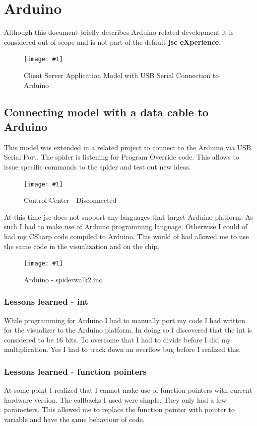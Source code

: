 \documentclass[12pt,leqno]{book}
\newcommand{\png}[1]{\texttt{[image: \#1]}}
\newcommand{\figpng}[2]{\begin{figure}[htb]\centering\png{#1}\caption{#2}\end{figure}}
\begin{document}
\chapter{Arduino}

Although this document briefly describes Arduino related development it is considered out of scope and is not part of the default \textbf{jsc eXperience}.

\figpng{Images/withusb}
{Client Server Application Model with USB Serial Connection to Arduino}

\section{Connecting model with a data cable to Arduino}
This model was extended in a related project to connect to the Arduino via USB Serial Port. 
The spider is listening for Program Override code. This allows to issue specific commands to the spider
and test out new ideas.

\figpng{Images/Hello_world_-_Google_Chrome-2012-03-15_08.11.17}
{Control Center - Disconnected}




At this time jsc does not support any languages that target Arduino platform. As such I had to make use of Arduino programming language. Otherwise I could of had my CSharp code compiled to Arduino. This would of had allowed me to use the same code in the visualization and on the chip.

\figpng{Images/spiderwalk2__Arduino_1.0-2012-03-14_18.04.43}
{Arduino - spiderwalk2.ino}


\subsection{Lessons learned - int}
While programming for Arduino I had to manually port my code I had written for the visualizer to the Arduino platform. In doing so I discovered that the int is considered to be 16 bits.  To overcome that I had to divide before I did my multiplication. Yes I had to track down an overflow bug before I realized this.

\subsection{Lessons learned - function pointers}
At some point I realized that I cannot make use of function pointers with current hardware version. The callbacks I used were simple. They only had a few parameters. This allowed me to replace the function pointer with pointer to variable and have the same behaviour of code.
\end{document}
